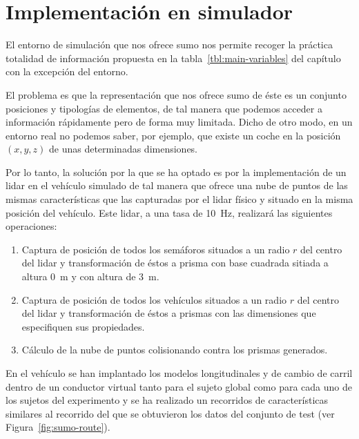 \chapter{Implementación en simulador}
\label{ch:simulation-implementation}

El entorno de simulación que nos ofrece \ac{sumo} nos permite recoger la práctica totalidad de información propuesta en la tabla~\ref{tbl:main-variables} del capítulo  con la excepción del entorno.

El problema es que la representación que nos ofrece \ac{sumo} de éste es un conjunto posiciones y tipologías de elementos, de tal manera que podemos acceder a información rápidamente pero de forma muy limitada. Dicho de otro modo, en un entorno real no podemos saber, por ejemplo, que existe un coche en la posición $(x, y, z)$ de unas determinadas dimensiones.

Por lo tanto, la solución por la que se ha optado es por la implementación de un \ac{lidar} en el vehículo simulado de tal manera que ofrece una nube de puntos de las mismas características que las capturadas por el \ac{lidar} físico y situado en la misma posición del vehículo. Este \ac{lidar}, a una tasa de \SI{10}{\hertz}, realizará las siguientes operaciones:

\begin{enumerate}
	\item Captura de posición de todos los semáforos situados a un radio $r$ del centro del \ac{lidar} y transformación de éstos a prisma con base cuadrada sitiada a altura \SI{0}{\meter} y con altura de \SI{3}{\meter}.
	\item Captura de posición de todos los vehículos situados a un radio $r$ del centro del \ac{lidar} y transformación de éstos a prismas con las dimensiones que especifiquen sus propiedades.
	\item Cálculo de la nube de puntos colisionando contra los prismas generados.
\end{enumerate}

En el vehículo se han implantado los modelos longitudinales y de cambio de carril dentro de un conductor virtual tanto para el sujeto global como para cada uno de los sujetos del experimento y se ha realizado un recorridos de características similares al recorrido del que se obtuvieron los datos del conjunto de test (ver Figura~\ref{fig:sumo-route}).

